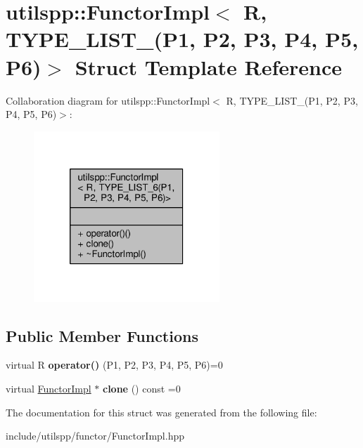 \hypertarget{structutilspp_1_1FunctorImpl_3_01R_00_01TYPE__LIST__6_07P1_00_01P2_00_01P3_00_01P4_00_01P5_00_01P6_08_4}{\section{utilspp\-:\-:Functor\-Impl$<$ R, T\-Y\-P\-E\-\_\-\-L\-I\-S\-T\-\_(P1, P2, P3, P4, P5, P6)$>$ Struct Template Reference}
\label{structutilspp_1_1FunctorImpl_3_01R_00_01TYPE__LIST__6_07P1_00_01P2_00_01P3_00_01P4_00_01P5_00_01P6_08_4}
}


Collaboration diagram for utilspp\-:\-:Functor\-Impl$<$ R, T\-Y\-P\-E\-\_\-\-L\-I\-S\-T\-\_(P1, P2, P3, P4, P5, P6)$>$\-:\nopagebreak
\begin{figure}[H]
\begin{center}
\leavevmode
\includegraphics[width=198pt]{structutilspp_1_1FunctorImpl_3_01R_00_01TYPE__LIST__6_07P1_00_01P2_00_01P3_00_01P4_00_01P5_00_01P6_08_4__coll__graph}
\end{center}
\end{figure}
\subsection*{Public Member Functions}
\begin{DoxyCompactItemize}
\item 
\hypertarget{structutilspp_1_1FunctorImpl_3_01R_00_01TYPE__LIST__6_07P1_00_01P2_00_01P3_00_01P4_00_01P5_00_01P6_08_4_a90958296e67a04bb1735edec2454539b}{virtual R {\bfseries operator()} (P1, P2, P3, P4, P5, P6)=0}\label{structutilspp_1_1FunctorImpl_3_01R_00_01TYPE__LIST__6_07P1_00_01P2_00_01P3_00_01P4_00_01P5_00_01P6_08_4_a90958296e67a04bb1735edec2454539b}

\item 
\hypertarget{structutilspp_1_1FunctorImpl_3_01R_00_01TYPE__LIST__6_07P1_00_01P2_00_01P3_00_01P4_00_01P5_00_01P6_08_4_a2056e2f82094a554c54fadcebfa21c67}{virtual \hyperlink{structutilspp_1_1FunctorImpl}{Functor\-Impl} $\ast$ {\bfseries clone} () const =0}\label{structutilspp_1_1FunctorImpl_3_01R_00_01TYPE__LIST__6_07P1_00_01P2_00_01P3_00_01P4_00_01P5_00_01P6_08_4_a2056e2f82094a554c54fadcebfa21c67}

\end{DoxyCompactItemize}


The documentation for this struct was generated from the following file\-:\begin{DoxyCompactItemize}
\item 
include/utilspp/functor/Functor\-Impl.\-hpp\end{DoxyCompactItemize}
